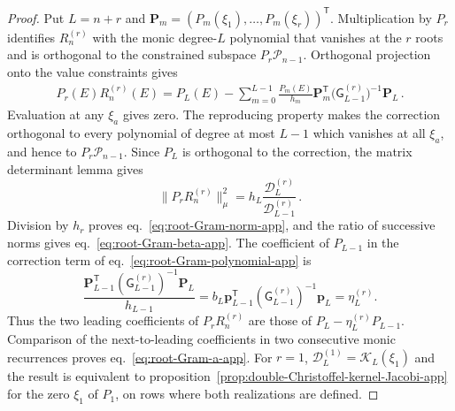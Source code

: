 \documentclass[a4paper,11pt]{article}
\theoremstyle{definition}
\theoremstyle{remark}
\newcommand{\cP}{\mathcal P}
\begin{document}
\begin{proof}
Put $L=n+r$ and
$\boldsymbol P_m=(P_m(\xi_1),\ldots,P_m(\xi_r))^{\mathsf T}$.
Multiplication by $P_r$ identifies $R_n^{(r)}$ with the monic
degree-$L$ polynomial that vanishes at the $r$ roots and is orthogonal
to the constrained subspace $P_r\cP_{n-1}$.  Orthogonal projection onto
the value constraints gives 
\begin{equation}
\begin{aligned}
   P_r(E)R_n^{(r)}(E)
   =P_L(E)-\sum_{m=0}^{L-1}\frac{P_m(E)}{h_m}
      \boldsymbol P_m^{\mathsf T}
      \bigl(\mathsf G_{L-1}^{(r)}\bigr)^{-1}
      \boldsymbol P_L\,.
\end{aligned}
   \label{eq:root-Gram-polynomial-app}
\end{equation}
Evaluation at any $\xi_a$ gives zero.  The reproducing property makes
the correction orthogonal to every polynomial of degree at most $L-1$
which vanishes at all $\xi_a$, and hence to $P_r\cP_{n-1}$.
Since $P_L$ is orthogonal to the correction, the matrix determinant
lemma \cite{HornJohnson2013} gives
\begin{equation}
   \bigl\|P_rR_n^{(r)}\bigr\|_\mu^2
   =h_L\frac{\mathcal D_L^{(r)}}{\mathcal D_{L-1}^{(r)}}\,.
\end{equation}
Division by $h_r$ proves eq.~\eqref{eq:root-Gram-norm-app}, and the
ratio of successive norms gives eq.~\eqref{eq:root-Gram-beta-app}.
The coefficient of $P_{L-1}$ in the correction term of
eq.~\eqref{eq:root-Gram-polynomial-app} is
\begin{equation}
   \frac{\boldsymbol P_{L-1}^{\mathsf T}
      (\mathsf G_{L-1}^{(r)})^{-1}\boldsymbol P_L}{h_{L-1}}
   =b_L\boldsymbol p_{L-1}^{\mathsf T}
      (\mathsf G_{L-1}^{(r)})^{-1}\boldsymbol p_L
   =\eta_L^{(r)}.
\end{equation}
Thus the two leading coefficients of $P_rR_n^{(r)}$ are those of $P_L-\eta_L^{(r)}P_{L-1}$. 
Comparison of the next-to-leading coefficients in two consecutive monic
recurrences proves eq.~\eqref{eq:root-Gram-a-app}.
For $r=1$, $\mathcal D_L^{(1)}=\mathcal K_L(\xi_1)$ and the result is
equivalent to proposition~\ref{prop:double-Christoffel-kernel-Jacobi-app}
for the zero $\xi_1$ of $P_1$, on rows where both realizations are defined.
\end{proof}
\end{document}
